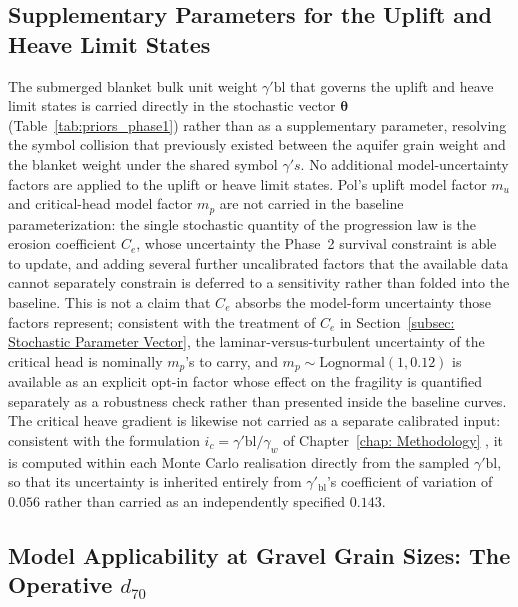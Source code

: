 \subsection{Supplementary Parameters for the Uplift and Heave Limit States}
\label{subsec: Supplementary Parameters for the Uplift and Heave Limit States}

The submerged blanket bulk unit weight $\gamma'\mathrm{bl}$ that governs the uplift and heave limit states is carried directly in the stochastic vector $\boldsymbol{\theta}$ (Table~\ref{tab:priors_phase1}) rather than as a supplementary parameter, resolving the symbol collision that previously existed between the aquifer grain weight and the blanket weight under the shared symbol $\gamma's$. No additional model-uncertainty factors are applied to the uplift or heave limit states. Pol's uplift model factor $m_u$ and critical-head model factor $m_p$ \parencite{pol_sie_2024} are not carried in the baseline parameterization: the single stochastic quantity of the progression law is the erosion coefficient $C_e$, whose uncertainty the Phase~2 survival constraint is able to update, and adding several further uncalibrated factors that the available data cannot separately constrain is deferred to a sensitivity rather than folded into the baseline. This is not a claim that $C_e$ absorbs the model-form uncertainty those factors represent; consistent with the treatment of $C_e$ in Section~\ref{subsec: Stochastic Parameter Vector}, the laminar-versus-turbulent uncertainty of the critical head is nominally $m_p$'s to carry, and $m_p \sim \mathrm{Lognormal}(1, 0.12)$ is available as an explicit opt-in factor whose effect on the fragility is quantified separately as a robustness check rather than presented inside the baseline curves. The critical heave gradient is likewise not carried as a separate calibrated input: consistent with the formulation $i_c = \gamma'\mathrm{bl}/\gamma_w$ of Chapter~\ref{chap: Methodology} \parencite{terzaghi1943}, it is computed within each Monte Carlo realisation directly from the sampled $\gamma'\mathrm{bl}$, so that its uncertainty is inherited entirely from $\gamma'_\mathrm{bl}$'s coefficient of variation of $0.056$ rather than carried as an independently specified $0.143$.

\subsection{Model Applicability at Gravel Grain Sizes: The Operative \texorpdfstring{$d_{70}$}{d70}}
\label{subsec: Model Applicability at Gravel Grain Sizes}

